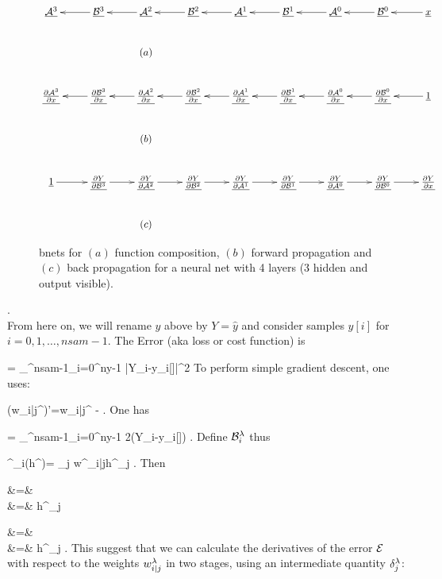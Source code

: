 \begin{figure}[h!]
\centering
$$
\xymatrix{
\ul{\cala^3}
&
\ul{\calb^3}\ar[l]
&
\ul{\cala^2}\ar[l]
&
\ul{\calb^2}\ar[l]
&
\ul{\cala^1}\ar[l]
&
\ul{\calb^1}\ar[l]
&
\ul{\cala^0}\ar[l]
&
\ul{\calb^0}\ar[l]
&
\rvx\ar[l]
\\
&&\text{$(a)$}
\\
\ul{\pder{\cala^3}{x}}
&
\ul{\pder{\calb^3}{x}}\ar[l]
&
\ul{\pder{\cala^2}{x}}\ar[l]
&
\ul{\pder{\calb^2}{x}}\ar[l]
&
\ul{\pder{\cala^1}{x}}\ar[l]
&
\ul{\pder{\calb^1}{x}}\ar[l]
&
\ul{\pder{\cala^0}{x}}\ar[l]
&
\ul{\pder{\calb^0}{x}}\ar[l]
&
\ul{1}\ar[l]
\\
&&\text{$(b)$}
\\
\ul{1}\ar[r]
&
\ul{\pder{Y}{\calb^3}}\ar[r]
&
\ul{\pder{Y}{\cala^2}}\ar[r]
&
\ul{\pder{Y}{\calb^2}}\ar[r]
&
\ul{\pder{Y}{\cala^1}}\ar[r]
&
\ul{\pder{Y}{\calb^1}}\ar[r]
&
\ul{\pder{Y}{\cala^0}}\ar[r]
&
\ul{\pder{Y}{\calb^0}}\ar[r]
&
\ul{\pder{Y}{x}}
\\
&&\text{$(c)$}
}
$$
\caption{bnets for $(a)$ function
composition, $(b)$
forward propagation and $(c)$ back propagation
for a neural net with 4 layers (3 hidden and
output visible).}
\label{fig-backp-nn}
\end{figure}
.\\
From here on, we will rename $y$ above
by $Y=\hat{y}$ and 
consider samples $y[i]$ for 
$i=0, 1, \ldots, nsam-1$.
The Error (aka loss or cost function) is

\beq
\cale =
\sum_{}^{nsam-1}\sum_{i=0}^{ny-1}
|Y_i-y_i[\sigma]|^2
\eeq
To perform simple gradient descent,
one uses:

\beq
(w_{i|j}^\lam)'=w_{i|j}^\lam
-\eta{}
\;.
\eeq
One has

\beq
{}=
\sum_{}^{nsam-1}\sum_{i=0}^{ny-1}
2(Y_i-y_i[\sigma])
\;.
\eeq
Define ${\cal B}^\lambda_i$ thus


\beq
\calb^\lam_i(h^{})=
\sum_j w^{\lam}_{i|j}h^{}_j
\;.
\label{eq-calb}
\eeq
Then

\beqa
{}&=&
\\
&=&
h^{}_j
\eeqa

\beqa
{}&=&
\\
&=&
h^{}_j
\;.
\eeqa
This suggest that
we can calculate 
the derivatives of the error
${\cal E}$
with respect to the weights
$w^\lambda_{i|j}$ in two 
stages, using an intermediate 
quantity $\delta^\lambda_j$:

